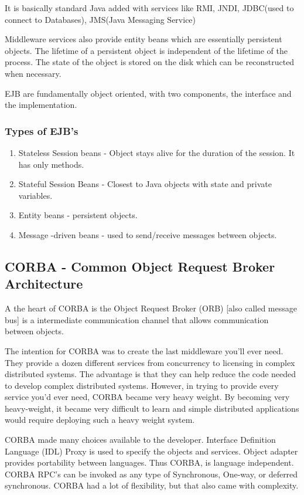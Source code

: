 \documentclass[a4paper]{article}
\begin{document}
It is basically standard Java added with services like RMI, JNDI, JDBC(used to connect to Databases), JMS(Java Messaging Service)

Middleware services also provide entity beans which are essentially persistent objects. The lifetime of a persistent object is independent of the lifetime of the process. The state of the object is stored on the disk which can be reconstructed when necessary.

EJB are fundamentally object oriented, with two components, the interface and the implementation.

\subsubsection{Types of EJB's}


\begin{enumerate}
  \item  Stateless Session beans - Object stays alive for the duration of the session. It has only methods.
  \item Stateful Session Beans - Closest to Java objects with state and private variables.
  \item  Entity beans - persistent objects.
  \item Message -driven beans - used to send/receive messages between objects.
\end{enumerate}


\subsection{CORBA - Common Object Request Broker Architecture}

A the heart of CORBA is the Object Request Broker (ORB) [also called message bus] is a intermediate communication channel that allows communication between objects.

The intention for CORBA was to create the last middleware you'll ever need. They provide a dozen different services from concurrency to licensing in complex distributed systems. The advantage is that they can help reduce the code needed to develop complex distributed systems. However, in trying to provide every service you'd ever need, CORBA became very heavy weight. By becoming very heavy-weight, it became very difficult to learn and simple distributed applications would require deploying such a heavy weight system.

CORBA made many choices available to the developer. Interface Definition Language (IDL) Proxy is used to specify the objects and services. Object adapter provides portability between languages. Thus CORBA, is language independent. CORBA RPC's can be invoked as any type of Synchronous, One-way, or deferred synchronous. CORBA had a lot of flexibility, but that also came with complexity.
\end{document}

